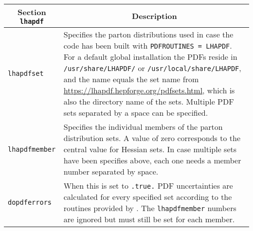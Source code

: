 	\begin{longtable}{p{1.5cm}p{12cm}}
		\toprule
		\multicolumn{1}{c}{{\textbf{Section} \texttt{lhapdf}}} & \multicolumn{1}{c}{{\textbf{Description}}} \\ 
		\midrule
		\texttt{lhapdfset} &
		Specifies the parton distributions used in case the code has been built with
		\texttt{PDFROUTINES = LHAPDF}. For a default global installation the PDFs reside
		in \texttt{/usr/share/LHAPDF/} or \texttt{/usr/local/share/LHAPDF}, and the name
		equals the set name from \url{https://lhapdf.hepforge.org/pdfsets.html}, which is
		also the directory name of the sets. Multiple PDF sets separated by a space can be specified. \\
		\texttt{lhapdfmember} & Specifies the individual members of the parton distribution sets.
		A value of zero corresponds to the central value for Hessian sets. In case multiple sets
		have been specifies above, each one needs a member number separated by space. \\
		\texttt{dopdferrors} & When this is set to \texttt{.true.} PDF uncertainties are calculated
		for every specified \PDF{} set according to the routines provided by \LHAPDF{}.
		The \texttt{lhapdfmember} numbers are ignored but must still be set for each member. \\
		\bottomrule
	\end{longtable}
